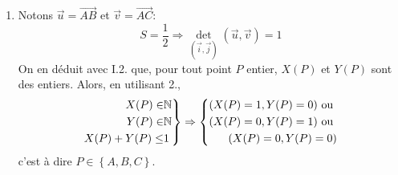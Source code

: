 \begin{enumerate}
 \item Notons $\overrightarrow{u} = \overrightarrow{AB}$ et $\overrightarrow{v} = \overrightarrow{AC}$:
\begin{displaymath}
  S = \frac{1}{2} \Rightarrow \det_{(\overrightarrow{i},\overrightarrow{j})}(\overrightarrow{u},\overrightarrow{v})=1
\end{displaymath}
On en déduit avec I.2. que, pour tout point $P$ entier, $X(P)$ et $Y(P)$ sont des entiers. Alors, en utilisant 2.,
\begin{displaymath}
\left. 
\begin{aligned}
  X(P)\in& \mathbb{N} \\ Y(P)\in& \mathbb{N} \\ X(P)+Y(P)\leq& 1
\end{aligned}
\right\rbrace 
\Rightarrow
\left\lbrace 
\begin{aligned}
  (X(P)=1, Y(P)=0) \text{ ou }&\\ (X(P)=0, Y(P)=1) \text{ ou }&\\ (X(P)=0, Y(P)=0)
\end{aligned}
\right.  
\end{displaymath}
c'est à dire $P\in\left\lbrace A, B, C\right\rbrace$. 


\end{enumerate}
